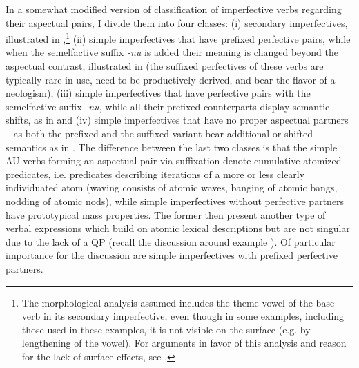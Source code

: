 \documentclass[output=paper]{langscibook}
\begin{document}
In a somewhat modified version of  classification of imperfective verbs regarding their aspectual pairs, I divide them into four classes: (i) secondary imperfectives, illustrated in ,\footnote{The morphological analysis assumed includes the theme vowel of the base verb in its secondary imperfective, even though in some examples, including those used in these examples, it is not visible on the surface (e.g. by lengthening of the vowel). For arguments in favor of this analysis and reason for the lack of surface effects, see \citet{SimMilAr2021}.} (ii) simple imperfectives that have prefixed perfective pairs, while when the semelfactive suffix \textit{-nu} is added their meaning is changed beyond the aspectual contrast, illustrated in  (the suffixed perfectives of these verbs are typically rare in use, need to be productively derived, and bear the flavor of a neologism), (iii) simple imperfectives that have perfective pairs with the semelfactive suffix \textit{-nu}, while all their prefixed counterparts display semantic shifts, as in  and (iv) simple imperfectives that have no proper aspectual partners -- as both the prefixed and the suffixed variant bear additional or shifted semantics as in . The difference between the last two classes is that the simple AU verbs forming an aspectual pair via suffixation denote cumulative atomized predicates, i.e. predicates describing iterations of a more or less clearly individuated atom (waving consists of atomic waves, banging of atomic bangs, nodding of atomic nods), while simple imperfectives without perfective partners have prototypical mass properties. The former then present another type of verbal expressions which build on atomic lexical descriptions but are not singular due to the lack of a QP (recall the discussion around example ). Of particular importance for the discussion are simple imperfectives with prefixed perfective partners.\largerpage
\end{document}
